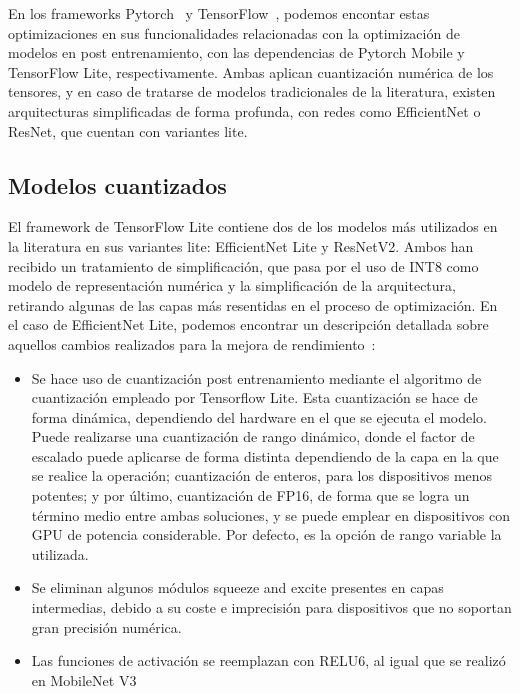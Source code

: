 En los frameworks Pytorch~\cite{paszke2019pytorch} y TensorFlow~\cite{tensorflow2015-whitepaper}, podemos encontar estas optimizaciones en sus funcionalidades relacionadas con la optimización de modelos en post entrenamiento, con las dependencias de Pytorch Mobile y TensorFlow Lite, respectivamente. Ambas aplican cuantización numérica de los tensores, y en caso de tratarse de modelos tradicionales de la literatura, existen arquitecturas simplificadas de forma profunda, con redes como EfficientNet o ResNet, que cuentan con variantes lite.

\subsection{Modelos cuantizados}

El framework de TensorFlow Lite contiene dos de los modelos más utilizados en la literatura en sus variantes lite: EfficientNet Lite y ResNetV2. Ambos han recibido un tratamiento de simplificación, que pasa por el uso de INT8 como modelo de representación numérica y la simplificación de la arquitectura, retirando algunas de las capas más resentidas en el proceso de optimización. En el caso de EfficientNet Lite, podemos encontrar un descripción detallada sobre aquellos cambios realizados para la mejora de rendimiento~\cite{eflite2}:

\begin{itemize}
	\item Se hace uso de cuantización post entrenamiento mediante el algoritmo de cuantización empleado por Tensorflow Lite. Esta cuantización se hace de forma dinámica, dependiendo del hardware en el que se ejecuta el modelo. Puede realizarse una cuantización de rango dinámico, donde el factor de escalado puede aplicarse de forma distinta dependiendo de la capa en la que se realice la operación; cuantización de enteros, para los dispositivos menos potentes; y 	por último, cuantización de FP16, de forma que se logra un término medio entre ambas soluciones, y se puede emplear en dispositivos con GPU de potencia considerable. Por defecto, es la opción de rango variable la utilizada.
	\item Se eliminan algunos módulos squeeze and excite presentes en capas intermedias, debido a su coste e imprecisión para dispositivos que no soportan gran precisión numérica.
	\item Las funciones de activación se reemplazan con RELU6, al igual que se realizó en MobileNet V3~\cite {howard2019searching} 
\end{itemize}

